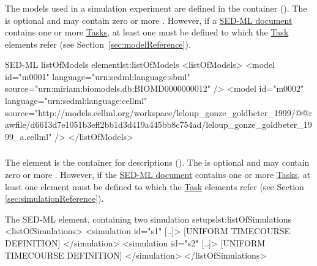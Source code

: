 \subsubsection{}
\label{class:listOfModels}
The models used in a simulation experiment are defined in the  container (). The  is optional and may contain zero or more \Models. However, if a \hyperref[class:sed-ml]{SED-ML document} contains one or more \hyperref[class:abstractTask]{Tasks}, at least one \Model must be defined to which the \hyperref[class:abstractTask]{Task} elements refer (see Section~\ref{sec:modelReference}).


\begin{myXmlLst}{SED-ML listOfModels element}{lst:listOfModels}
<listOfModels>
	<model id="m0001" language="urn:sedml:language:sbml" 
		source="urn:miriam:biomodels.db:BIOMD0000000012" />
	<model id="m0002" language="urn:sedml:language:cellml" 
		source="http://models.cellml.org/workspace/leloup_gonze_goldbeter_1999/@@rawfile/d6613d7e1051b3eff2bb1d3d419a445bb8c754ad/leloup_gonze_goldbeter_1999_a.cellml" />
</listOfModels>
\end{myXmlLst}


\subsubsection{}
\label{class:listOfSimulations}
The  element is the container for \Simulation descriptions (). The  is optional and may contain zero or more \Simulations. However, if the \hyperref[class:sed-ml]{SED-ML document} contains one or more \hyperref[class:abstractTask]{Tasks}, at least one \Simulation element must be defined to which the \hyperref[class:abstractTask]{Task} elements refer (see Section \ref{sec:simulationReference}).

\begin{myXmlLst}{The SED-ML  element, containing two simulation setups}{lst:listOfSimulations}
<listOfSimulations>
	<simulation id="s1" [..]>
		[UNIFORM TIMECOURSE DEFINITION]
	</simulation>
	<simulation id="s2" [..]>
   		[UNIFORM TIMECOURSE DEFINITION]
	</simulation>
</listOfSimulations>
\end{myXmlLst}
 
